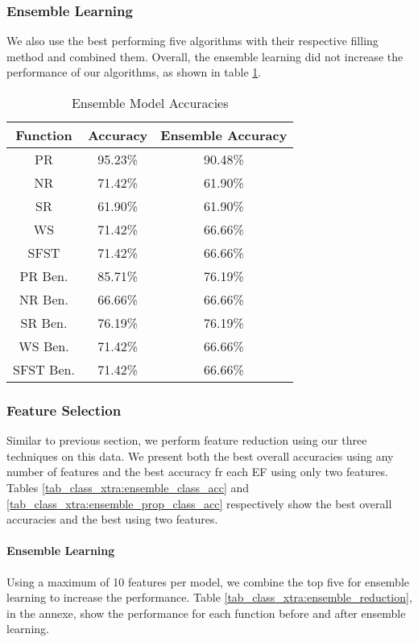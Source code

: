 \documentclass[12pt,letterpaper]{article}
\begin{document}
\subsubsection{Ensemble Learning}
We also use the best performing five algorithms with their respective filling method and combined them.
Overall, the ensemble learning did not increase the performance of our algorithms, as shown in table \ref{tab_xtra:class_ensemble}.
\begin{table}[H]
\centering
\begin{tabular}{|c|c|c|}
\hline
\textbf{Function} & \textbf{Accuracy} & \textbf{Ensemble Accuracy} \\
\hline
PR      & 95.23\% & 90.48\% \\
\hline
NR      & 71.42\% & 61.90\%\\
\hline
SR      & 61.90\% & 61.90\%\\
\hline
WS      & 71.42\% & 66.66\%\\
\hline
SFST    & 71.42\% & 66.66\%\\
\hline
PR Ben. & 85.71\% & 76.19\%\\
\hline
NR Ben. & 66.66\% & 66.66\%\\
\hline
SR Ben. & 76.19\% & 76.19\%\\
\hline
WS Ben. & 71.42\% & 66.66\%\\
\hline
SFST Ben. & 71.42\% & 66.66\%\\
\hline
\end{tabular}
\caption{Ensemble Model Accuracies}
\label{tab_xtra:class_ensemble}
\end{table}

\subsubsection{Feature Selection}
Similar to previous section, we perform feature reduction using our three techniques on this data.
We present both the best overall accuracies using any number of features and the best accuracy fr each \ac{EF} using only two features.
Tables \ref{tab_class_xtra:ensemble_class_acc} and \ref{tab_class_xtra:ensemble_prop_class_acc} respectively show the best overall accuracies and the best using two features.


\paragraph{Ensemble Learning}
Using a maximum of 10 features per model, we combine the top five for ensemble learning to increase the performance.
Table \ref{tab_class_xtra:ensemble_reduction}, in the annexe, show the performance for each function before and after ensemble learning.
\end{document}
